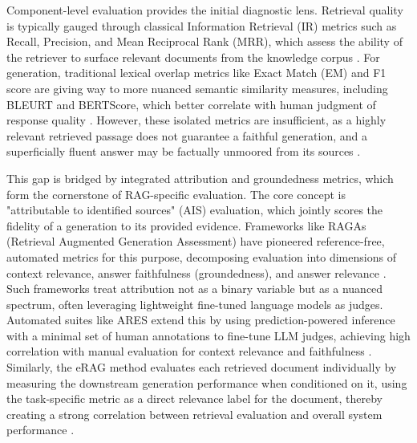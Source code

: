 \documentclass[11pt,a4paper]{article}
\begin{document}
Component-level evaluation provides the initial diagnostic lens. Retrieval quality is typically gauged through classical Information Retrieval (IR) metrics such as Recall, Precision, and Mean Reciprocal Rank (MRR), which assess the ability of the retriever to surface relevant documents from the knowledge corpus \cite{arxiv:2404.10981v1}. For generation, traditional lexical overlap metrics like Exact Match (EM) and F1 score are giving way to more nuanced semantic similarity measures, including BLEURT and BERTScore, which better correlate with human judgment of response quality \cite{arxiv:2405.07437v2}. However, these isolated metrics are insufficient, as a highly relevant retrieved passage does not guarantee a faithful generation, and a superficially fluent answer may be factually unmoored from its sources \cite{arxiv:2312.10997v5}.

This gap is bridged by integrated attribution and groundedness metrics, which form the cornerstone of RAG-specific evaluation. The core concept is "attributable to identified sources" (AIS) evaluation, which jointly scores the fidelity of a generation to its provided evidence. Frameworks like RAGAs (Retrieval Augmented Generation Assessment) have pioneered reference-free, automated metrics for this purpose, decomposing evaluation into dimensions of context relevance, answer faithfulness (groundedness), and answer relevance \cite{arxiv:2309.15217v1}. Such frameworks treat attribution not as a binary variable but as a nuanced spectrum, often leveraging lightweight fine-tuned language models as judges. Automated suites like ARES extend this by using prediction-powered inference with a minimal set of human annotations to fine-tune LLM judges, achieving high correlation with manual evaluation for context relevance and faithfulness \cite{arxiv:2405.07437v2}. Similarly, the eRAG method evaluates each retrieved document individually by measuring the downstream generation performance when conditioned on it, using the task-specific metric as a direct relevance label for the document, thereby creating a strong correlation between retrieval evaluation and overall system performance \cite{arxiv:2404.13781v1}.
\end{document}
